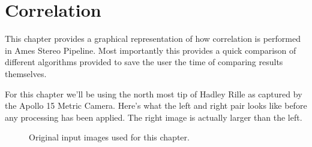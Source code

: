 \chapter{Correlation}

This chapter provides a graphical representation of how correlation is
performed in Ames Stereo Pipeline. Most importantly this provides a
quick comparison of different algorithms provided to save the user the
time of comparing results themselves.

For this chapter we'll be using the north most tip of Hadley Rille as
captured by the Apollo 15 Metric Camera. Here's what the left and right
pair looks like before any processing has been applied. The right image
is actually larger than the left.

\begin{figure}[hb]
\centering
  \hfil
\caption{Original input images used for this chapter.}
\label{fig:input_images}
\end{figure}

